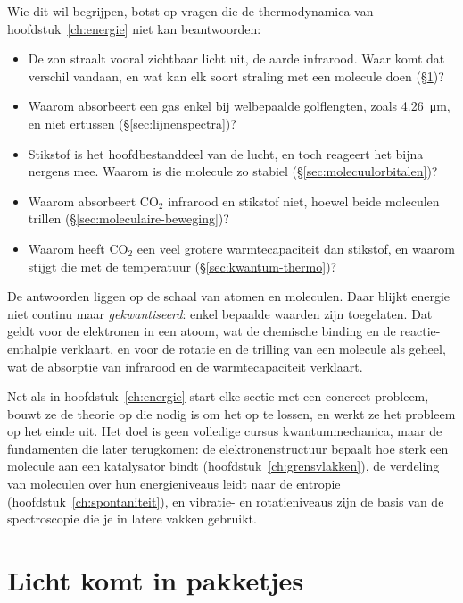 Wie dit wil begrijpen, botst op vragen die de thermodynamica van hoofdstuk~\ref{ch:energie} niet kan beantwoorden:
\begin{itemize}
\item De zon straalt vooral zichtbaar licht uit, de aarde infrarood. Waar komt dat verschil vandaan, en wat kan elk soort straling met een molecule doen (\S\ref{sec:licht-pakketjes})?
\item Waarom absorbeert een gas enkel bij welbepaalde golflengten, zoals \SI{4.26}{\micro\metre}, en niet ertussen (\S\ref{sec:lijnenspectra})?
\item Stikstof is het hoofdbestanddeel van de lucht, en toch reageert het bijna nergens mee. Waarom is die molecule zo stabiel (\S\ref{sec:molecuulorbitalen})?
\item Waarom absorbeert CO$_2$ infrarood en stikstof niet, hoewel beide moleculen trillen (\S\ref{sec:moleculaire-beweging})?
\item Waarom heeft CO$_2$ een veel grotere warmtecapaciteit dan stikstof, en waarom stijgt die met de temperatuur (\S\ref{sec:kwantum-thermo})?
\end{itemize}
De antwoorden liggen op de schaal van atomen en moleculen. Daar blijkt energie niet continu maar \emph{gekwantiseerd}: enkel bepaalde waarden zijn toegelaten. Dat geldt voor de elektronen in een atoom, wat de chemische binding en de reactie-enthalpie verklaart, en voor de rotatie en de trilling van een molecule als geheel, wat de absorptie van infrarood en de warmtecapaciteit verklaart.

Net als in hoofdstuk~\ref{ch:energie} start elke sectie met een concreet probleem, bouwt ze de theorie op die nodig is om het op te lossen, en werkt ze het probleem op het einde uit. Het doel is geen volledige cursus kwantummechanica, maar de fundamenten die later terugkomen: de elektronenstructuur bepaalt hoe sterk een molecule aan een katalysator bindt (hoofdstuk~\ref{ch:grensvlakken}), de verdeling van moleculen over hun energieniveaus leidt naar de entropie (hoofdstuk~\ref{ch:spontaniteit}), en vibratie- en rotatieniveaus zijn de basis van de spectroscopie die je in latere vakken gebruikt.

\section{Licht komt in pakketjes}
\label{sec:licht-pakketjes}

